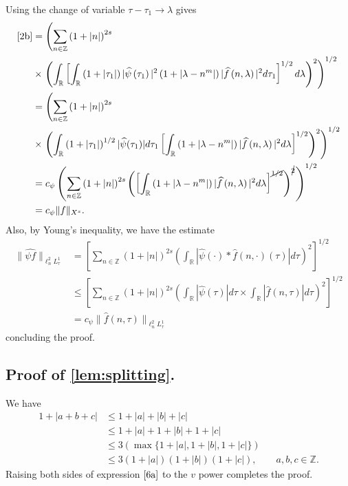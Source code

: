 \documentclass[12pt,reqno]{amsart}
\numberwithin{equation}{section}  %
\numberwithin{figure}{section}
\newcommand{\rr}{\mathbb{R}}
\newcommand{\zz}{\mathbb{Z}}
\newcommand{\wh}{\widehat}
\theoremstyle{plain}
\theoremstyle{definition}
\theoremstyle{remark}
\begin{document}
%
%
Using the change of variable $\tau - \tau_1 \to \lambda$ gives
%
%
\begin{equation*}
	\begin{split}
		\eqref{2b}
		& = \left( \sum_{n \in \zz} \left (1 + |n| \right )^{2s}\right.
		\\
		& \times \left.  \left( \int_\rr \left[
		\int_\rr \left( 1 + | \tau_1 | \right) | \wh{\psi}\left( \tau_1
		\right) |^2 \left( 1 + | \lambda - n^{m} | \right) | \wh{f} \left( n,
		\lambda
		\right)|^2 d \tau_1 \right]^{1/2} d \lambda \right)^2 \right)^{1/2}
		\\
		& =  \left( \sum_{n \in \zz} \left (1 + |n| \right )^{2s} \right.
		\\
		& \times \left. \left( \int_\rr \left( 1 + |
		\tau_1 |
		\right)^{1/2} | \wh{\psi}(\tau_1) | d \tau_1 \left[ \int_\rr \left( 1 + |
		\lambda - n^{m} |
		\right) | \wh{f}\left( n, \lambda \right) |^2 d \lambda \right]^{1/2}
		\right)^2 \right)^{1/2}
		\\
		& = c_{\psi} \left( \sum_{n \in \zz} \left (1 + |n| \right )^{2s} \left( \left[ \int_\rr
		\left( 1 + | \lambda - n^{m} | \right) | \wh{f}\left( n, \lambda
		\right) |^2 d \lambda
		\right]^{\cancel{1/2}} \right)^{\cancel{2}} \right)^{1/2}
		\\
		& = c_{\psi} \|f\|_{X^s}.
	\end{split}
\end{equation*}
%
Also, by Young's inequality, we have the estimate 
%
%
\begin{equation*}
\begin{split}
  \|\wh{\psi f}\|_{\ell^{2}_{n} L^{1}_{\tau}} 
  & = \left[ \sum_{n \in \zz} \left (1 + |n| \right )^{2s} \left (
  \int_{\rr} | \wh{\psi}(\cdot) * \wh{f}(n, \cdot)(\tau) | d \tau  \right ) ^2 \right]^{1/2}
  \\
  & \le  \left[ \sum_{n \in \zz} (1 + | n |)^{2s} \left( \int_{\rr} |
    \wh{\psi}(\tau) | d \tau  \times \int_{\rr} | \wh{f}(n, \tau) | d \tau
    \right)^{2}\right]^{1/2}
  \\
  & = c_{\psi} \| \wh{f}(n, \tau) \|_{\ell^{2}_{n} L^{1}_{\tau}}
\end{split}
\end{equation*}
%
%
%
concluding the proof. \qquad \qedsymbol
\subsection{Proof of \autoref{lem:splitting}.} We have
%
%
\begin{equation}
	\label{6a}
	\begin{split}
		1 + | a + b + c| 
		& \le 1 + | a | + | b | + | c |
		\\
		& \le 1 + | a | + 1 + | b | + 1 + | c |
		\\
		& \le 3\left( \max\{1+| a |, 1+| b |, 1+ | c | \}\right)
		\\
		& \le 3 \left( 1 + | a | \right)\left( 1 + | b | \right) \left( 1 + |
		c |
		\right), \qquad a, b, c \in \zz.
	\end{split}
\end{equation}
%
%
Raising both sides of expression $\eqref{6a}$ to the $v$ power completes 
the proof. \qquad \qedsymbol 
%
%
%
\end{document}

